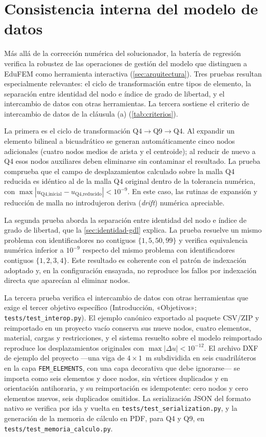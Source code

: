 \section{Consistencia interna del modelo de datos}
\label{sec:consistencia-interna}

Más allá de la corrección numérica del solucionador, la batería de regresión verifica la robustez de las operaciones de gestión del modelo que distinguen a EduFEM como herramienta interactiva (\autoref{sec:arquitectura}). Tres pruebas resultan especialmente relevantes: el ciclo de transformación entre tipos de elemento, la separación entre identidad del nodo e índice de grado de libertad, y el intercambio de datos con otras herramientas. La tercera sostiene el criterio de intercambio de datos de la cláusula (a) (\autoref{tab:criterios}).

La primera es el ciclo de transformación $\text{Q4}\rightarrow\text{Q9}\rightarrow\text{Q4}$. Al expandir un elemento bilineal a bicuadrático se generan automáticamente cinco nodos adicionales (cuatro nodos medios de arista y el centroide); al reducir de nuevo a Q4 esos nodos auxiliares deben eliminarse sin contaminar el resultado. La prueba comprueba que el campo de desplazamientos calculado sobre la malla Q4 reducida es idéntico al de la malla Q4 original dentro de la tolerancia numérica, con $\max|u_{\text{Q4,inicial}} - u_{\text{Q4,reducido}}| < 10^{-9}$. En este caso, las rutinas de expansión y reducción de malla no introdujeron deriva (\emph{drift}) numérica apreciable.

La segunda prueba aborda la separación entre identidad del nodo e índice de grado de libertad, que la \autoref{sec:identidad-gdl} explica. La prueba resuelve un mismo problema con identificadores no contiguos $\{1,5,50,99\}$ y verifica equivalencia numérica inferior a $10^{-9}$ respecto del mismo problema con identificadores contiguos $\{1,2,3,4\}$. Este resultado es coherente con el patrón de indexación adoptado y, en la configuración ensayada, no reproduce los fallos por indexación directa que aparecían al eliminar nodos.

La tercera prueba verifica el intercambio de datos con otras herramientas que exige el tercer objetivo específico (Introducción, «Objetivos»; \texttt{tests/test\_interop.py}). El ejemplo canónico exportado al paquete CSV/ZIP y reimportado en un proyecto vacío conserva sus nueve nodos, cuatro elementos, material, cargas y restricciones, y el sistema resuelto sobre el modelo reimportado reproduce los desplazamientos originales con $\max|\Delta u| < 10^{-12}$. El archivo DXF de ejemplo del proyecto —una viga de $4\times1$~m subdividida en seis cuadriláteros en la capa \texttt{FEM\_ELEMENTS}, con una capa decorativa que debe ignorarse— se importa como seis elementos y doce nodos, sin vértices duplicados y en orientación antihoraria, y su reimportación es idempotente: cero nodos y cero elementos nuevos, seis duplicados omitidos. La serialización JSON del formato nativo se verifica por ida y vuelta en \texttt{tests/test\_serialization.py}, y la generación de la memoria de cálculo en PDF, para Q4 y Q9, en \texttt{tests/test\_memoria\_calculo.py}.


